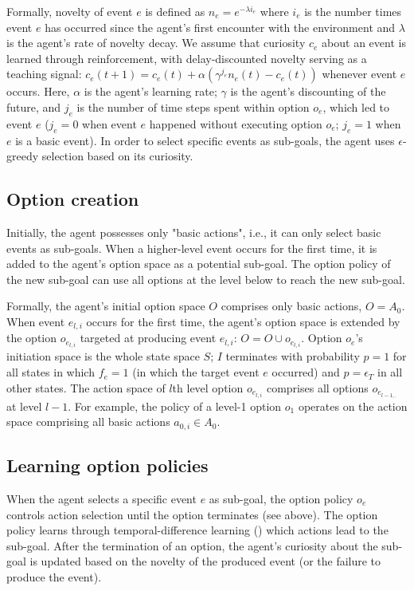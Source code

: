 \documentclass{article}
\begin{document}
Formally, novelty of event $e$ is defined as $n_e = e^{-\lambda i_e}$ where $i_e$ is the number times event $e$ has occurred since the agent's first encounter with the environment and $\lambda$ is the agent's rate of novelty decay. We assume that curiosity $c_e$ about an event is learned through reinforcement, with delay-discounted novelty serving as a teaching signal: $c_e(t+1) = c_e(t) + \alpha (\gamma^{j_e} n_e(t) - c_e(t))$ whenever event $e$ occurs. Here, $\alpha$ is the agent's learning rate; $\gamma$ is the agent's discounting of the future, and $j_e$ is the number of time steps spent within option $o_e$, which led to event $e$ ($j_e = 0$ when event $e$ happened without executing option $o_e$; $j_e = 1$ when $e$ is a basic event). In order to select specific events as sub-goals, the agent uses $\epsilon$-greedy selection based on its curiosity.

\subsection{Option creation}

Initially, the agent possesses only "basic actions", i.e., it can only select basic events as sub-goals. When a higher-level event occurs for the first time, it is added to the agent's option space as a potential sub-goal. The option policy of the new sub-goal can use all options at the level below to reach the new sub-goal.

Formally, the agent's initial option space $O$ comprises only basic actions, $O = A_0$. When event $e_{l, i}$ occurs for the first time, the agent's option space is extended by the option $o_{e_{l, i}}$ targeted at producing event $e_{l, i}$: $O = O \cup o_{e_{l, i}}$. Option $o_e$'s initiation space is the whole state space $S$; $I$ terminates with probability $p=1$ for all states in which $f_e = 1$ (in which the target event $e$ occurred) and $p = \epsilon_T$ in all other states. The action space of $l$th level option $o_{e_{l, i}}$ comprises all options $o_{e_{l-1, .}}$ at level $l-1$. For example, the policy of a level-1 option $o_1$ operates on the action space comprising all basic actions $a_{0, i} \in A_0$. 

\subsection{Learning option policies}

When the agent selects a specific event $e$ as sub-goal, the option policy $o_e$ controls action selection until the option terminates (see above). The option policy learns through temporal-difference learning (\cite{sutton_reinforcement_2017}) which actions lead to the sub-goal. After the termination of an option, the agent's curiosity about the sub-goal is updated based on the novelty of the produced event (or the failure to produce the event).
\end{document}
